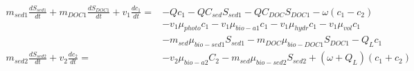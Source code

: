 \documentclass[fleqn, oneside, 11pt]{article}%
\begin{document}
\begin{preview}
\begin{align*}%
m_{sed1} \frac{dS_{sed1}}{dt} + m_{DOC1} \frac{dS_{DOC1}}{dt} + v_{1} \frac{dc_{1}}{dt} = 
&-Qc_{1}-QC_{sed}S_{sed1}-QC_{DOC}S_{DOC1}-\omega(c_{1}-c_{2}) \\ 
&-v_{1}\mu_{photo}c_{1}-v_{1}\mu_{bio-a1}c_{1}-v_{1}\mu_{hydr}c_{1}-v_{1}\mu_{vol}c_{1} \\
&-m_{sed}\mu_{bio-sed1}S_{sed1}-m_{DOC}\mu_{bio-DOC1}S_{DOC1}-Q_{L}c_{1} \\ 
m_{sed2} \frac{dS_{sed2}}{dt} + v_{2} \frac{dc_{2}}{dt} = 
&-v_{2}\mu_{bio-a2}C_{2}-m_{sed}\mu_{bio-sed2}S_{sed2}+(\omega+Q_{L})(c_{1}+c_{2}) \\ 
\end{align*} 
\end{preview}
\end{document}
